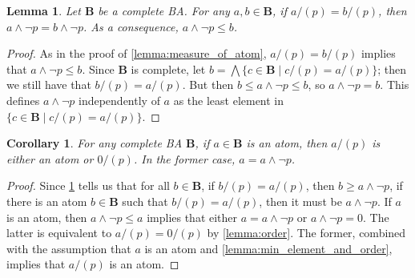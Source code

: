 \documentclass{article}
\newtheorem{theorem}{Theorem}
\newtheorem{lemma}{Lemma}
\newtheorem{corollary}{Corollary}
\theoremstyle{definition}
\theoremstyle{remark}
\DeclareMathOperator{\WMC}{WMC}
\begin{document}
\begin{lemma} \label{lemma:minimal_in_quotient} %
  Let $\mathbf{B}$ be a complete BA. For any $a, b \in \mathbf{B}$, if $a/(p) =
  b/(p)$, then $a \land \neg p = b \land \neg p$. As a consequence, $a \land
  \neg p \le b$.
\end{lemma}
\begin{proof} %
  As in the proof of \cref{lemma:measure_of_atom}, $a/(p) = b/(p)$ implies that
  $a \land \neg p \le b$. Since $\mathbf{B}$ is complete, let $b = \bigwedge \{
  c \in \mathbf{B} \mid c/(p) = a/(p) \}$; then we still have that $b/(p) =
  a/(p)$. But then $b \le a \land \neg p \le b$, so $a \land \neg p = b$. This
  defines $a \land \neg p$ independently of $a$ as the least element in $\{c \in
  \mathbf{B} \mid c/(p) = a/(p) \}$.
\end{proof}

\begin{corollary}
  For any complete BA $\mathbf{B}$, if $a \in \mathbf{B}$ is an atom, then
  $a/(p)$ is either an atom or $0/(p)$. In the former case, $a = a \land \neg
  p$.
\end{corollary}
\begin{proof}
  Since \cref{lemma:minimal_in_quotient} tells us that for all $b \in
  \mathbf{B}$, if $b/(p) = a/(p)$, then $b \ge a \land \neg p$, if there is an
  atom $b \in \mathbf{B}$ such that $b/(p) = a/(p)$, then it must be $a \land
  \neg p$. If $a$ is an atom, then $a \land \neg p \le a$ implies that either $a
  = a \land \neg p$ or $a \land \neg p = 0$. The latter is equivalent to $a/(p)
  = 0/(p)$ by \cref{lemma:order}. The former, combined with the assumption that
  $a$ is an atom and \cref{lemma:min_element_and_order}, implies that $a/(p)$ is
  an atom.
\end{proof}


\end{document}
